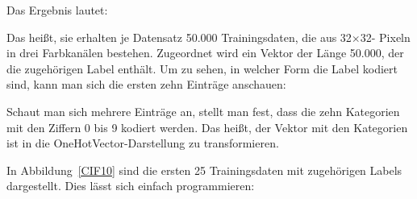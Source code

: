 


\medskip

Das Ergebnis lautet:

\medskip





\medskip

Das heißt, sie erhalten je Datensatz 50.000 Trainingsdaten, die aus 32$\times$32- Pixeln in drei Farbkanälen bestehen. 
Zugeordnet wird ein Vektor der Länge 50.000, der die zugehörigen Label enthält. Um zu sehen, in welcher Form die Label kodiert sind, kann man sich die ersten zehn Einträge anschauen:

\medskip


\PYTHON{}

\PYTHON{[6]}

\PYTHON{\quad [9]}

\PYTHON{\quad [9]}

\PYTHON{\quad [4]}

\PYTHON{\quad [1]}

\PYTHON{\quad [1]}

\PYTHON{\quad [2]}

\PYTHON{\quad [7]}

\PYTHON{\quad [8]}

\PYTHON{\quad [3]]}

\medskip

Schaut man sich mehrere Einträge an, stellt man fest, dass die zehn Kategorien mit den Ziffern 0 bis 9 kodiert werden. Das heißt, der Vektor mit den Kategorien ist in die OneHotVector-Darstellung zu transformieren.

In Abbildung~\ref{CIF10} sind die ersten 25 Trainingsdaten mit zugehörigen Labels dargestellt. Dies lässt sich einfach programmieren:


\medskip



